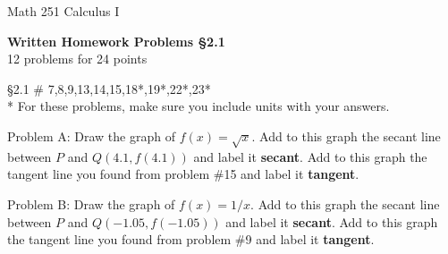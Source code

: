 \documentclass[11pt]{report}
\theoremstyle{plain}
\begin{document}
\hfill Math 251 Calculus I
\begin{center}
\Large{\textbf{Written Homework Problems \S 2.1}} \\
12 problems for 24 points\\
\end{center}
\begin{description}
\item{\S 2.1} \# 7,8,9,13,14,15,18*,19*,22*,23* \\

* For these problems, make sure you include units with your answers.\\

\item Problem A: Draw the graph of $f(x)=\sqrt{x}.$ Add to this graph the secant line between $P$ and $Q(4.1, f(4.1))$ and label it \textbf{secant}. Add to this graph the tangent line you found from problem \#15 and label it \textbf{tangent}.

\item Problem B: Draw the graph of $f(x)=1/x.$ Add to this graph the secant line between $P$ and $Q(-1.05, f(-1.05))$ and label it \textbf{secant}. Add to this graph the tangent line you found from problem \#9 and label it \textbf{tangent}.

\end{description}
\end{document}
